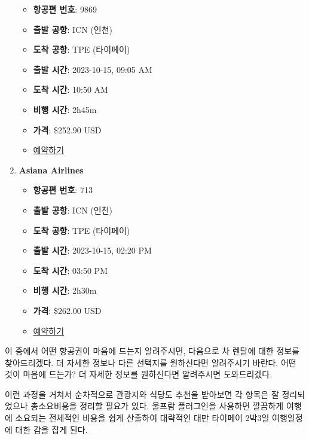 \documentclass[
  letterpaper,
]{book}
\providecommand{\tightlist}{%
  \setlength{\itemsep}{0pt}\setlength{\parskip}{0pt}}\usepackage{longtable,booktabs,array}
\begin{document}
\begin{tcolorbox}
\begin{enumerate}
  \begin{itemize}
  \tightlist
  \item
    \textbf{항공편 번호}: 9869
  \item
    \textbf{출발 공항}: ICN (인천)
  \item
    \textbf{도착 공항}: TPE (타이페이)
  \item
    \textbf{출발 시간}: 2023-10-15, 09:05 AM
  \item
    \textbf{도착 시간}: 10:50 AM
  \item
    \textbf{비행 시간}: 2h45m
  \item
    \textbf{가격}: \$252.90 USD
  \item
    \href{https://apim.expedia.com/recommendations/og-redirect/a706e76f-e215-4dd3-b180-9e20f00c0de5}{예약하기}
  \end{itemize}
\item
  \textbf{Asiana Airlines}

  \begin{itemize}
  \tightlist
  \item
    \textbf{항공편 번호}: 713
  \item
    \textbf{출발 공항}: ICN (인천)
  \item
    \textbf{도착 공항}: TPE (타이페이)
  \item
    \textbf{출발 시간}: 2023-10-15, 02:20 PM
  \item
    \textbf{도착 시간}: 03:50 PM
  \item
    \textbf{비행 시간}: 2h30m
  \item
    \textbf{가격}: \$262.00 USD
  \item
    \href{https://apim.expedia.com/recommendations/og-redirect/e1901b01-9303-431e-9847-ff54af4ea8a2}{예약하기}
  \end{itemize}
\end{enumerate}

이 중에서 어떤 항공권이 마음에 드는지 알려주시면, 다음으로 차 렌탈에
대한 정보를 찾아드리겠다. 더 자세한 정보나 다른 선택지를 원하신다면
알려주시기 바란다. 어떤 것이 마음에 드는가? 더 자세한 정보를 원하신다면
알려주시면 도와드리겠다.

\end{tcolorbox}

이런 과정을 거쳐서 순차적으로 관광지와 식당도 추천을 받아보면 각 항목은
잘 정리되었으나 총소요비용을 정리할 필요가 있다. 울프람 플러그인을
사용하면 깔끔하게 여행에 소요되는 전체적인 비용을 쉽게 산출하여 대략적인
대만 타이페이 2박3일 여행일정에 대한 감을 잡게 된다.
\end{document}
